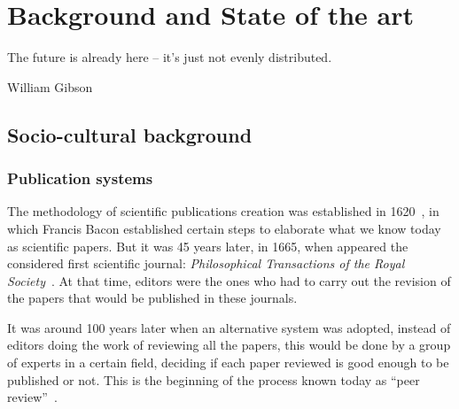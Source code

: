 \chapter{Background and State of the art}

\begin{FraseCelebre}
  \begin{Frase}
    The future is already here – it's just not evenly distributed.
  \end{Frase}
  \begin{Fuente}
    William Gibson
  \end{Fuente}
\end{FraseCelebre}


\section{Socio-cultural background}
\label{scb}
\subsection{Publication systems}
\label{scb:ps}
The methodology of scientific publications creation was established in
1620~\cite{bacon1878novum}, in which Francis Bacon established certain steps to
elaborate what we know today as scientific papers. But it was 45 years later, in
1665, when appeared the considered first scientific journal: \emph{Philosophical
  Transactions of the Royal Society}~\cite{kronick1976history}. At that time,
editors were the ones who had to carry out the revision of the papers that would
be published in these journals.


It was around 100 years later when an alternative system was adopted, instead of
editors doing the work of reviewing all the papers, this would be done by a
group of experts in a certain field, deciding if each paper reviewed is good
enough to be published or not. This is the beginning of the process known today
as ``peer review''~\cite{spier2002history}.

